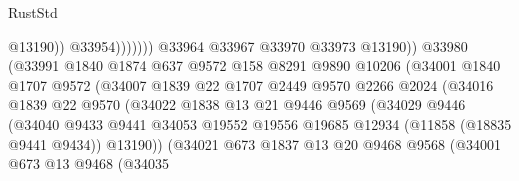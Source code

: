 \begin{lexlean}{RustStd}
\begin{coremodule}
                                                @13190))
                                            @33954)))))))
                              @33964
                              @33967
                              @33970
                              @33973
                              @13190))
                          @33980
                          (@33991
                            @1840
                            @1874
                            @637
                            @9572
                            @158
                            @8291
                            @9890
                            @10206
                            (@34001
                              @1840
                              @1707
                              @9572
                              (@34007
                                @1839
                                @22
                                @1707
                                @2449
                                @9570
                                @2266
                                @2024
                                (@34016
                                  @1839
                                  @22
                                  @9570
                                  (@34022
                                    @1838
                                    @13
                                    @21
                                    @9446
                                    @9569
                                    (@34029
                                      @9446
                                      (@34040
                                        @9433
                                        @9441
                                        @34053
                                        @19552
                                        @19556
                                        @19685
                                        @12934
                                        (@11858 (@18835 @9441 @9434))
                                        @13190))
                                    (@34021
                                      @673
                                      @1837
                                      @13
                                      @20
                                      @9468
                                      @9568
                                      (@34001
                                        @673
                                        @13
                                        @9468
                                        (@34035

\end{coremodule}
\end{lexlean}
